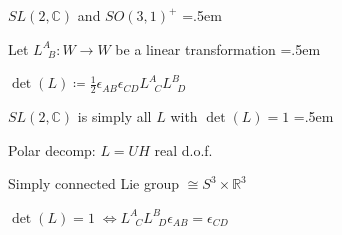\documentclass[xcolor={dvipsnames}]{beamer}
\let\olditemize=\itemize
\let\endolditemize=\enditemize
\renewenvironment{itemize}{\olditemize \itemsep=.5em }{\endolditemize}
\begin{document}
\begin{frame}{$SL(2, \mathbb{C})$ and $SO(3, 1)^+$}
    \begin{itemize}
        \item<2-> Let $L_{\;\;B}^A : W\rightarrow W$ be a linear transformation
        \begin{itemize}
            \item<3-> $\det(L) \coloneqq \frac{1}{2}\epsilon_{AB}\epsilon_{CD}L_{\;\;C}^AL_{\;\;D}^B$
        \end{itemize}
        \item<4-> $SL(2, \mathbb{C})$ is simply all $L$ with $\det(L) = 1$
        \begin{itemize}
            \item<5-> Polar decomp: $L = UH$ \textrightarrow{} real d.o.f.
            \item<6-> Simply connected Lie group $\cong S^3\times\mathbb{R}^3$
            \item<7-> $\det(L)=1 \; \iff L_{\;\;C}^A L_{\;\;D}^B \epsilon_{AB} = \epsilon_{CD}$
        \end{itemize}
    \end{itemize}
\end{frame}
\end{document}
